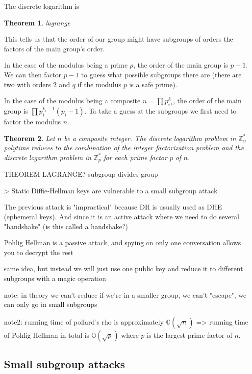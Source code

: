 \documentclass[a4paper,11pt]{article}
\newtheorem{theorem}{Theorem}
\begin{document}
The discrete logarithm is 

\begin{theorem}
lagrange
\end{theorem}

This tells us that the order of our group might have subgroups of orders the factors of the main group's order. 

In the case of the modulus being a prime $p$, the order of the main group is $p-1$. We can then factor $p-1$ to guess what possible subgroups there are (there are two with orders $2$ and $q$ if the modulus $p$ is a safe prime).

In the case of the modulus being a composite $n = \prod p_i^k_i$, the order of the main group is $\prod p_i^{k_i - 1}(p_i - 1)$. To take a guess at the subgroups we first need to factor the modulus $n$.

\begin{theorem}
Let $n$ be a composite integer. The discrete logarithm problem in $\mathbb{Z}^*_n$ polytime reduces to the combination of the integer factorization problem and the discrete logarithm problem in $\mathbb{Z}^*_p$ for each prime factor $p$ of $n$.
\end{theorem}



THEOREM LAGRANGE? subgroup divides group

> Static Diffie-Hellman keys are vulnerable to a small subgroup attack

The previous attack is "impractical" because DH is usually used as DHE (ephemeral keys). And since it is an active attack where we need to do several "handshake" (is this called a handshake?)

Pohlig Hellman is a passive attack, and spying on only one conversation allows you to decrypt the rest

same idea, but instead we will just use one public key and reduce it to different subgroups with a magic operation

note: in theory we can't reduce if we're in a smaller group, we can't "escape", we can only go in small subgroups

note2: running time of pollard's rho is approximately $\mathbb{O}(\sqrt{n})$ => running time of Pohlig Hellman in total is $\mathbb{O}(\sqrt{p})$ where $p$ is the largest prime factor of $n$.


\subsection{Small subgroup attacks}
\end{document}
